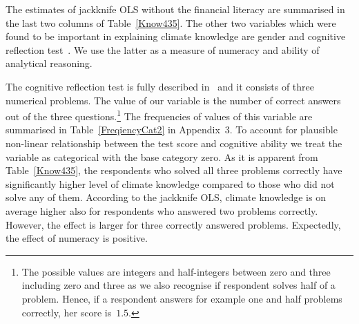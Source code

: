 \documentclass[a4paper,12pt]{article}
\begin{document}
The estimates of jackknife OLS without the financial literacy are summarised in the last two columns of Table~\ref{Know435}. The other two variables which were found to be important in explaining climate knowledge are gender and cognitive reflection test~\citep{Frederick2005}. We use the latter as a measure of numeracy and ability of analytical reasoning. 

The cognitive reflection test is fully described in~\citet{Frederick2005} and it consists of three numerical problems. The value of our variable is the number of correct answers out of the three questions.\footnote{The possible values are integers and half-integers between zero and three including zero and three as we also recognise if respondent solves half of a problem. Hence, if a respondent answers for example one and half problems correctly, her score is~$1.5$.} The frequencies of values of this variable are summarised in Table~\ref{FreqiencyCat2} in Appendix~$3$. To account for plausible non-linear relationship between the test score and cognitive ability we treat the variable as categorical with the base category zero. As it is apparent from Table~\ref{Know435}, the respondents who solved all three problems correctly have significantly higher level of climate knowledge compared to those who did not solve any of them. According to the jackknife OLS, climate knowledge is on average higher also for respondents who answered two problems correctly. However, the effect is larger for three correctly answered problems. Expectedly, the effect of numeracy is positive. 
 
\end{document}

